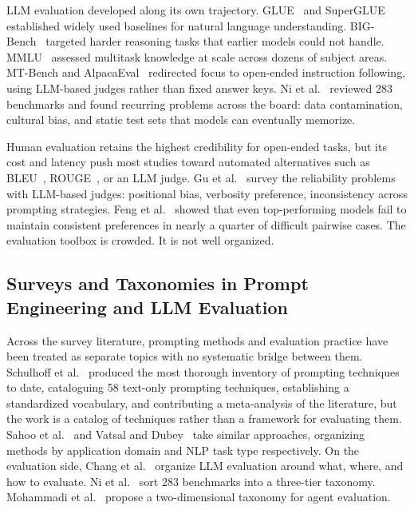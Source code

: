 \documentclass[journal]{IEEEtran}
\begin{document}
LLM evaluation developed along its own trajectory. GLUE~\cite{wang2018glue} and
SuperGLUE~\cite{wang2019superglue} established widely used baselines for natural language
understanding. BIG-Bench~\cite{srivastava2022bigbench} targeted harder
reasoning tasks that earlier models could not handle. MMLU~\cite{hendrycks2021measuring}
assessed multitask knowledge at scale across dozens of subject areas. MT-Bench and
AlpacaEval~\cite{zheng2023judging, dubois2024alpacaeval} redirected focus
to open-ended instruction following, using LLM-based judges rather than
fixed answer keys. Ni et al.~\cite{ni2025benchmarks} reviewed 283 benchmarks and found recurring problems across the board: data contamination, cultural bias, and static test sets that models can eventually memorize.

Human evaluation retains the highest credibility for open-ended tasks,
but its cost and latency push most studies toward automated alternatives such as BLEU~\cite{papineni2002bleu},
ROUGE~\cite{lin2004rouge}, or an LLM judge. Gu et al.~\cite{gu2025llmjudge}
survey the reliability problems with LLM-based judges: positional bias,
verbosity preference, inconsistency across prompting strategies. Feng et al.~\cite{feng2025sage} showed that even top-performing models fail to maintain consistent preferences in nearly a quarter of difficult pairwise cases. The evaluation toolbox is crowded. It is not well organized.

\subsection{Surveys and Taxonomies in Prompt Engineering and LLM Evaluation}

Across the survey literature, prompting methods and evaluation practice
have been treated as separate topics with no systematic bridge between
them. Schulhoff
et al.~\cite{schulhoff2024prompt} produced the most thorough inventory of
prompting techniques to date, cataloguing 58 text-only prompting techniques, establishing a standardized
vocabulary, and contributing a meta-analysis of the literature, but the work is a catalog of
techniques rather than a framework for evaluating them. Sahoo
et al.~\cite{sahoo2024systematic} and Vatsal and
Dubey~\cite{vatsal2024survey} take similar approaches, organizing methods
by application domain and NLP task type respectively. On the evaluation
side, Chang et al.~\cite{chang2023survey} organize LLM evaluation around
what, where, and how to evaluate. Ni et al.~\cite{ni2025benchmarks} sort 283 benchmarks into a three-tier taxonomy. Mohammadi
et al.~\cite{mohammadi2025agents} propose a two-dimensional taxonomy for
agent evaluation.
\end{document}
